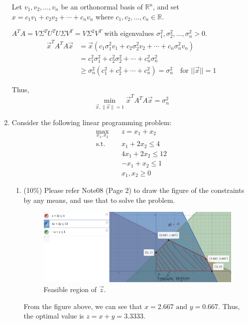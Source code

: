 \documentclass[a4paper,10pt]{article}
\begin{document}
\begin{enumerate}
{\color{blue}
    Let $v_1, v_2, \ldots, v_n$ be an orthonormal basis of $\mathbb{R}^n$, 
    and set $x = c_1v_1 + c_2v_2 + \cdots + c_n v_n$ where $c_1, c_2, \ldots, c_n \in \mathbb{R}$.

    $A^T A = V \Sigma^T U^T U \Sigma V^T = V \Sigma^2 V^T$ with eigenvalues $\sigma_1^2, \sigma_2^2, \ldots, \sigma_n^2 > 0$.
    \begin{align}
        \vec{x}^T A^T A \vec{x} &= \vec{x} (c_1 \sigma_1^2 v_1 + c_2 \sigma_2^2 v_2 + \cdots + c_n \sigma_n^2 v_n) \\
        &= c_1^2 \sigma_1^2 + c_2^2 \sigma_2^2 + \cdots + c_n^2 \sigma_n^2 \\
        &\geq \sigma_n^2(c_1^2 + c_2^2 + \cdots + c_n^2) = \sigma_n^2 \quad \text{for } ||\vec{x}|| = 1
    \end{align}

    Thus,
    \[
        \min_{\vec{x}, \|\vec{x}\|=1} \vec{x}^T A^T A \vec{x} = \sigma_n^2
    \]
}

\item Consider the following linear programming problem:
    \begin{equation}
        \begin{aligned}
            \max_{x_1,x_2} \quad & z=x_1+x_2 \\
            \textrm{s.t.} \quad & x_1 + 2x_2 \le 4  \\
                \quad& 4x_1 + 2x_2 \le 12   \\
                \quad& -x_1 + x_2 \le 1   \\
                \quad& x_1, x_2 \ge 0
        \end{aligned}
    \end{equation}

    \begin{enumerate}
        \item (10\%) Please refer Note08 (Page 2) to draw the figure of the constraints by any means, and use that to solve the problem. 
        \begin{figure}[H]
            \centering
            \includegraphics[scale=0.15]{./4a.png}
            \caption{Feasible region of $\vec{z}$.}
        \end{figure}
        {\color{blue}
            From the figure above, we can see that  $x = 2.667 \text{ and } y = 0.667$. 
            Thus, the optimal value is $z = x + y = 3.3333$.
        }


\end{enumerate}
\end{enumerate}
\end{document}
